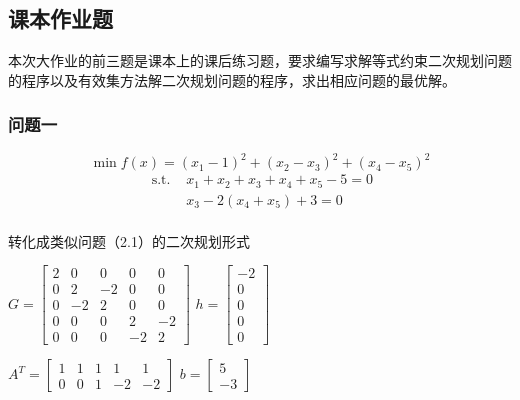\documentclass[12pt]{article}
\begin{document}
	    \subsection{课本作业题}
	    本次大作业的前三题是课本上的课后练习题，要求编写求解等式约束二次规划问题的程序以及有效集方法解二次规划问题的程序，求出相应问题的最优解。
	    
	       \vspace{15pt}
	       \subsubsection{问题一}
	          \[\min f(x) = (x_1 - 1)^2 + (x_2-x_3)^2 + (x_4 - x_5)^2 \]
	          \begin{align*}
	          \text{ s.t. } & x_1 + x_2 + x_3 + x_4 + x_5 - 5 =0 \\
	          & x_3 - 2(x_4+x_5) + 3 = 0 \\
	          \end{align*}
	          
	          转化成类似问题（2.1）的二次规划形式
	          \vspace{5pt}
	          \begin{center}
	          	
	          	$G = \begin{bmatrix}
	          	2 & 0 & 0 & 0 & 0 \\
	          	0 & 2 & -2 & 0 & 0 \\
	          	0 & -2 & 2 & 0 & 0 \\
	          	0 & 0 & 0 & 2 & -2 \\
	          	0 & 0 & 0 & -2 & 2 
	          	\end{bmatrix}$ \qquad
	          	$h = \begin{bmatrix}
	          	-2 \\ 0 \\ 0 \\ 0 \\ 0 
	          	\end{bmatrix}$
	          \end{center}
	          
	          \vspace{5pt}
	          
	          \begin{center}
	          	
	          	$A^T = \begin{bmatrix}
	          	1 & 1 & 1 & 1 & 1 \\
	          	0 & 0 & 1 & -2 & -2 
	          	\end{bmatrix}$ \qquad
	          	$b = \begin{bmatrix}
	          	5 \\ -3
	          	\end{bmatrix}$
	          \end{center}
	          \vspace{5pt}
	          
\end{document}
